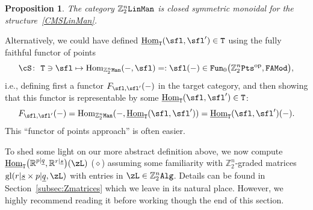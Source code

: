\documentclass[10pt,a4paper]{amsart}
\newcommand{\op}[1]{\operatorname{#1}}
\newcommand{\R}{{\mathbb R}}
\newcommand{\Z}{{\mathbb Z}}
\def\ul{\underline}
\def\ul{\underline}
\newcommand{\0}{\otimes}
\newcommand{\z}{\Z_2^n}
\numberwithin{equation}{section}
\newtheorem{Proposition}[Theorem]{Proposition}
 { \theoremstyle{definition}
\newtheorem{Definition}[Theorem]{Definition}
\newtheorem{Example}[Theorem]{Example}
\newtheorem{Remark}[Theorem]{Remark} }
\begin{document}
{\sloppy\begin{Proposition}
The category $\z{\tt LinMan}$ is closed symmetric monoidal for the struc\-ture~\eqref{CMSLinMan}.
\end{Proposition}

}

Alternatively, we could have defined $\ul{\op{Hom}}_{\tt T}(\sfl,\sfl')\in\tt T$ using the fully faithful functor of points
\[
\cS\colon\ {\tt T}\ni\sfl\mapsto \op{Hom}_{\z{\tt Man}}(-,\sfl)=:\sfl(-)\in{\tt Fun}_0\big(\z{\tt Pts}^{\op{op}},{\tt FAMod}\big),
\]
i.e., defining first a functor $F_{\sfl,\sfl'}(-)$ in the target category, and then showing that this functor is representable by some $\ul{\op{Hom}}_{\tt T}(\sfl,\sfl')\in\tt T$:
\[
F_{\sfl,\sfl'}(-)=\op{Hom}_{\z\tt Man}(-,\ul{\op{Hom}}_{\tt T}(\sfl,\sfl'))=\ul{\op{Hom}}_{\tt T}(\sfl,\sfl')(-).
\]
This ``functor of points approach'' is often easier.

{\sloppy
To shed some light on our more abstract definition above, we now compute $\ul{\op{Hom}}_{\tt T}\big(\R^{p|\ul q},\R^{r|\ul s}\big)(\zL)$ ($\diamond$) assuming some familiarity with $\z$-graded matrices $\op{gl}(r|\ul s \times p|\ul q,\zL)$ with entries in $\zL\in\z{\tt Alg}$. Details can be found in Section~\ref{subsec:Zmatrices} which we leave in its natural place. However, we highly recommend reading it before working though the end of this section.

}
\end{document}
